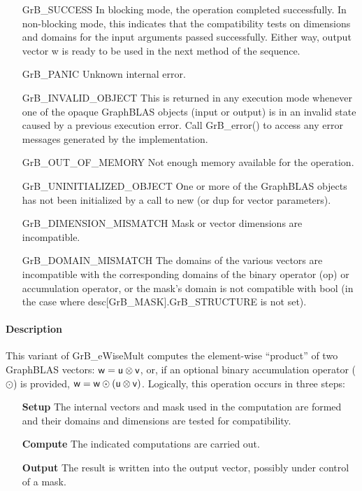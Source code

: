 \begin{itemize}[leftmargin=2.1in]
    \item[{\sf GrB\_SUCCESS}]         In blocking mode, the operation completed
    successfully. In non-blocking mode, this indicates that the compatibility 
    tests on dimensions and domains for the input arguments passed successfully. 
    Either way, output vector {\sf w} is ready to be used in the next method of 
    the sequence.

    \item[{\sf GrB\_PANIC}]           Unknown internal error.

    \item[{\sf GrB\_INVALID\_OBJECT}] This is returned in any execution mode 
    whenever one of the opaque GraphBLAS objects (input or output) is in an invalid 
    state caused by a previous execution error.  Call {\sf GrB\_error()} to access 
    any error messages generated by the implementation.

    \item[{\sf GrB\_OUT\_OF\_MEMORY}] Not enough memory available for the operation.

    \item[{\sf GrB\_UNINITIALIZED\_OBJECT}] One or more of the GraphBLAS objects
    has not been initialized by a call to {\sf new} (or {\sf dup} for vector
    parameters).

    \item[{\sf GrB\_DIMENSION\_MISMATCH}] Mask or vector dimensions are incompatible.

    \item[{\sf GrB\_DOMAIN\_MISMATCH}]    The domains of the various vectors are
    incompatible with the corresponding domains of the binary operator ({\sf op}) or
    accumulation operator, or the mask's domain is not compatible with {\sf bool}
    (in the case where {\sf desc[GrB\_MASK].GrB\_STRUCTURE} is not set).
\end{itemize}

\paragraph{Description}

This variant of {\sf GrB\_eWiseMult} computes the element-wise ``product'' of
two GraphBLAS vectors: ${\sf w} = {\sf u} \otimes {\sf v}$, or, if an optional
binary accumulation operator ($\odot$) is provided, ${\sf w} = {\sf w} \odot
\left({\sf u} \otimes {\sf v}\right)$.  Logically, this operation occurs in
three steps:
\begin{enumerate}[leftmargin=0.75in]
\item[\bf Setup] The internal vectors and mask used in the computation are formed 
and their domains and dimensions are tested for compatibility.
\item[\bf Compute] The indicated computations are carried out.
\item[\bf Output] The result is written into the output vector, possibly under 
control of a mask.
\end{enumerate}

